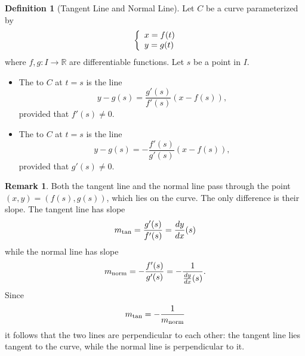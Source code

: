 \documentclass[10pt]{article}
\theoremstyle{definition}
\newtheorem{definition}[theorem]{Definition}
\newtheorem{remark}[theorem]{Remark}
\newcommand{\1}[1]{\textbf{1}_{\left[#1\right]}} %
\def\R{\mathbb{R}} %
\newcommand{\dempfcolor}[1]{{\color{RoyalBlue}#1}}
\newcommand{\demph}[1]{\dempfcolor{{\sl #1}}}
\begin{document}
\begin{definition}[Tangent Line and Normal Line]
  \label{def:tangent-line-and-normal-line}
  Let $C$ be a curve parameterized by
  \begin{equation*}
    \left\{ \begin{array}{l@{}l} x=f(t) \\ y=g(t) \end{array}\right.
  \end{equation*}
  where $f,g:I\to \R$ are differentiable functions. Let $s$ be a point in $I$.
  \begin{itemize}
    \item The \demph{tangent line} to $C$ at $t=s$ is the line
    \begin{equation*} y-g(s) = \frac{g'(s)}{f'(s)}\left(x-f(s)\right),
    \end{equation*} provided that $f'(s)\neq 0$. 
    \item The \demph{normal line} to $C$ at $t=s$ is the line
    \begin{equation*}
      y-g(s) = -\frac{f'(s)}{g'(s)}\left(x-f(s)\right),
    \end{equation*}
    provided that $g'(s)\neq 0$. 
  \end{itemize}
\end{definition}
\begin{remark}
  Both the tangent line and the normal line pass through the point $(x,y)=(f(s),g(s))$, which lies on the curve. The
  only difference is their slope. The tangent line has slope
  \begin{equation*}
    m_{\rm tan} = \frac{g'(s)}{f'(s)} = \frac{dy}{dx}(s)
  \end{equation*}
  while the normal line has slope
  \begin{equation*}
    m_{\rm norm}=-\frac{f'(s)}{g'(s)} = -\frac{1}{\frac{dy}{dx}(s)}.
  \end{equation*}
  Since
  \begin{equation*}
    m_{\rm tan} = -\frac{1}{m_{\rm norm}}
  \end{equation*}
  it follows that the two lines are perpendicular to each other: the tangent line lies tangent to the curve, while the
  normal line is perpendicular to it.
\end{remark}
\end{document}
